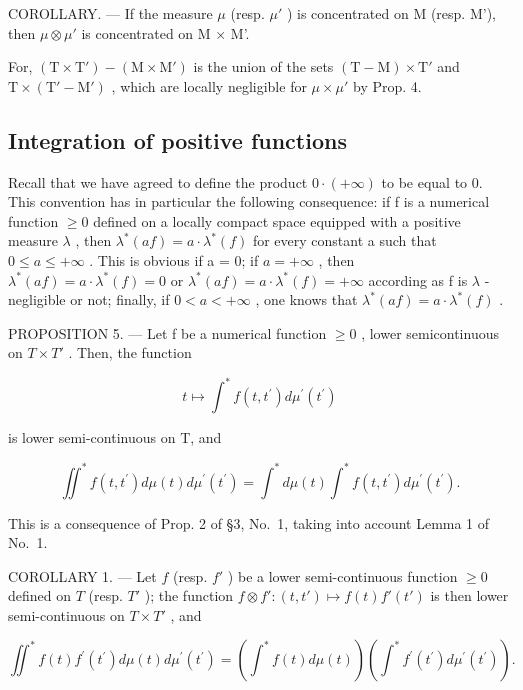 COROLLARY. --- If the measure \(\mu\) (resp. \(\mu'\) ) is concentrated on M (resp. M'), then \(\mu \otimes \mu'\) is concentrated on M × M'.

For, \((\mathrm{T} \times \mathrm{T}') - (\mathrm{M} \times \mathrm{M}')\) is the union of the sets \((\mathrm{T} - \mathrm{M}) \times \mathrm{T}'\) and \(\mathrm{T} \times (\mathrm{T}' - \mathrm{M}')\) , which are locally negligible for \(\mu \times \mu'\) by Prop. 4.

\subsection{Integration of positive functions}

Recall that we have agreed to define the product \(0 \cdot (+\infty)\) to be equal to 0. This convention has in particular the following consequence: if f is a numerical function \(\geqslant 0\) defined on a locally compact space equipped with a positive measure \(\lambda\) , then \(\lambda^{*}(af) = a \cdot \lambda^{*}(f)\) for every constant a such that \(0 \leqslant a \leqslant +\infty\) . This is obvious if a = 0; if \(a = +\infty\) , then \(\lambda^{*}(af) = a \cdot \lambda^{*}(f) = 0\) or \(\lambda^{*}(af) = a \cdot \lambda^{*}(f) = +\infty\) according as f is \(\lambda\) -negligible or not; finally, if \(0 < a < +\infty\) , one knows that \(\lambda^{*}(af) = a \cdot \lambda^{*}(f)\) .

PROPOSITION 5. --- Let f be a numerical function \(\geqslant 0\) , lower semicontinuous on \(T \times T'\) . Then, the function

\[
t \mapsto \int^ {*} f (t, t ^ {\prime}) d \mu^ {\prime} (t ^ {\prime})
\]

is lower semi-continuous on T, and

\[
\iint^ {*} f (t, t ^ {\prime}) d \mu (t) d \mu^ {\prime} (t ^ {\prime}) = \int^ {*} d \mu (t) \int^ {*} f (t, t ^ {\prime}) d \mu^ {\prime} (t ^ {\prime}).\tag{3}
\]

This is a consequence of Prop. 2 of §3, No.~1, taking into account Lemma 1 of No.~1.

COROLLARY 1. --- Let \(f\) (resp. \(f'\) ) be a lower semi-continuous function \(\geqslant 0\) defined on \(T\) (resp. \(T'\) ); the function \(f \otimes f': (t, t') \mapsto f(t)f'(t')\) is then lower semi-continuous on \(T \times T'\) , and

\[
\iint^ {*} f (t) f ^ {\prime} \left(t ^ {\prime}\right) d \mu (t) d \mu^ {\prime} \left(t ^ {\prime}\right) = \left(\int^ {*} f (t) d \mu (t)\right) \left(\int^ {*} f ^ {\prime} \left(t ^ {\prime}\right) d \mu^ {\prime} \left(t ^ {\prime}\right)\right).\tag{6}
\]

